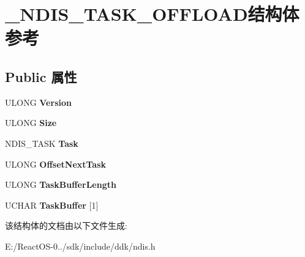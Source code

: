 \hypertarget{struct___n_d_i_s___t_a_s_k___o_f_f_l_o_a_d}{}\section{\+\_\+\+N\+D\+I\+S\+\_\+\+T\+A\+S\+K\+\_\+\+O\+F\+F\+L\+O\+A\+D结构体 参考}
\label{struct___n_d_i_s___t_a_s_k___o_f_f_l_o_a_d}
\subsection*{Public 属性}
\begin{DoxyCompactItemize}
\item 
\mbox{\label{struct___n_d_i_s___t_a_s_k___o_f_f_l_o_a_d_ac245bdfedaa28135adcbeef15b225e9b}} 
U\+L\+O\+NG {\bfseries Version}
\item 
\mbox{\label{struct___n_d_i_s___t_a_s_k___o_f_f_l_o_a_d_a9b6f53054d2590b42b6a71d895f431fe}} 
U\+L\+O\+NG {\bfseries Size}
\item 
\mbox{\label{struct___n_d_i_s___t_a_s_k___o_f_f_l_o_a_d_ad2b3a14ee0bfa2bcb85c2f3626286fb7}} 
N\+D\+I\+S\+\_\+\+T\+A\+SK {\bfseries Task}
\item 
\mbox{\label{struct___n_d_i_s___t_a_s_k___o_f_f_l_o_a_d_a40f1bedf75e248374f837edf275c0e4a}} 
U\+L\+O\+NG {\bfseries Offset\+Next\+Task}
\item 
\mbox{\label{struct___n_d_i_s___t_a_s_k___o_f_f_l_o_a_d_a3f8f3a48f01c455c185c8263a19b304b}} 
U\+L\+O\+NG {\bfseries Task\+Buffer\+Length}
\item 
\mbox{\label{struct___n_d_i_s___t_a_s_k___o_f_f_l_o_a_d_a79c9256c2ac22d0d93a4fb7d247d1c64}} 
U\+C\+H\+AR {\bfseries Task\+Buffer} \mbox{[}1\mbox{]}
\end{DoxyCompactItemize}


该结构体的文档由以下文件生成\+:\begin{DoxyCompactItemize}
\item 
E\+:/\+React\+O\+S-\/0../sdk/include/ddk/ndis.\+h\end{DoxyCompactItemize}
